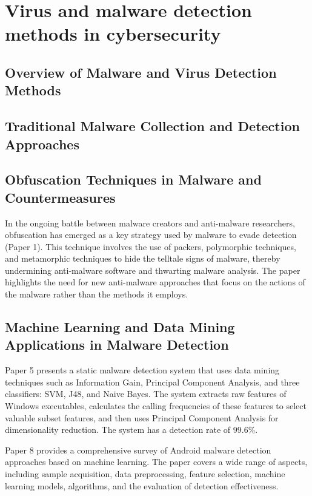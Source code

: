 \documentclass{article}
\begin{document}
\clearpage

\section{Virus and malware detection methods in cybersecurity}

\subsection{Overview of Malware and Virus Detection Methods}

\subsection{Traditional Malware Collection and Detection Approaches}

\subsection{Obfuscation Techniques in Malware and Countermeasures}

In the ongoing battle between malware creators and anti-malware researchers, obfuscation has emerged as a key strategy used by malware to evade detection (Paper 1). This technique involves the use of packers, polymorphic techniques, and metamorphic techniques to hide the telltale signs of malware, thereby undermining anti-malware software and thwarting malware analysis. The paper highlights the need for new anti-malware approaches that focus on the actions of the malware rather than the methods it employs.

\subsection{Machine Learning and Data Mining Applications in Malware Detection}

Paper 5 presents a static malware detection system that uses data mining techniques such as Information Gain, Principal Component Analysis, and three classifiers: SVM, J48, and Naive Bayes. The system extracts raw features of Windows executables, calculates the calling frequencies of these features to select valuable subset features, and then uses Principal Component Analysis for dimensionality reduction. The system has a detection rate of 99.6\%.

Paper 8 provides a comprehensive survey of Android malware detection approaches based on machine learning. The paper covers a wide range of aspects, including sample acquisition, data preprocessing, feature selection, machine learning models, algorithms, and the evaluation of detection effectiveness.
\end{document}
